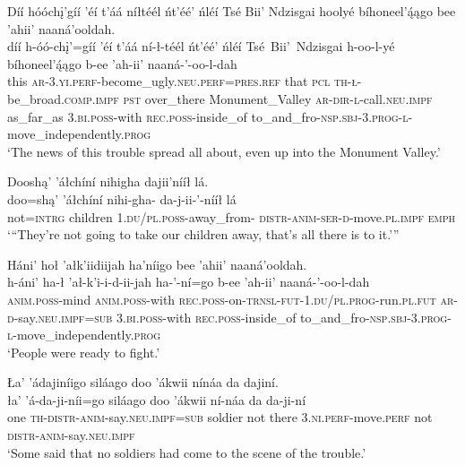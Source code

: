 \ea\label{ex:text3-5-1}
Díí hóóchį’gíí ’éí t’áá níłtéél ńt’éé’ ńléí Tsé Bii’ Ndzisgai hoolyé bíhoneel’ą́ągo bee ’ahii’ naaná’ooldah.\\
\gll díí	h-óó-chį’=gíí	’éí	t’áá ní-ł-téél ńt’éé’	ńléí	Tsé~Bii’~{Ndzisgai}	h-oo-l-yé	bíhoneel’ą́ągo	b-ee	’ah-ii’	naaná-’-oo-l-dah\\
     this	\textsc{ar}-3.\textsc{yi}.\textsc{perf}-become\_ugly.\textsc{neu}.\textsc{perf}=\textsc{pres}.\textsc{ref}	that	\textsc{pcl} \textsc{th}-\textsc{ł}-be\_broad.\textsc{comp}.\textsc{impf} \textsc{pst}	over\_there	Monument\_Valley	\textsc{ar}-\textsc{dir}-\textsc{l}-call.\textsc{neu}.\textsc{impf}	as\_far\_as	3.\textsc{bi}.\textsc{poss}-with	\textsc{rec}.\textsc{poss}-inside\_of	to\_and\_fro-\textsc{nsp}.\textsc{sbj}-3.\textsc{prog}-\textsc{l}-move\_independently.\textsc{prog}\\
\glt `The news of this trouble spread all about, even up into the Monument Valley.'
\z

\ea\label{ex:text3-5-2}
Dooshą’ ’áłchíní nihigha dajii’nííł lá.\\
\gll doo=shą’	’áłchíní	nihi-gha-	da-j-ii-’-nííł	lá\\
     not=\textsc{intrg}	children	1.\textsc{du}/\textsc{pl}.\textsc{poss}-away\_from-	\textsc{distr}-\textsc{anim}-\textsc{ser}-\textsc{d}-move.\textsc{pl}.\textsc{impf}	\textsc{emph}\\
\glt `{``}They're not going to take our children away, that's all there is to it.'''
\z

\ea\label{ex:text3-5-3}
Háni’ hoł ’ałk’iidiijah ha’níigo bee ’ahii’ naaná’ooldah.\\
\gll h-áni’	ha-ł	’ał-k’i-i-d-ii-jah	ha-’-ní=go	b-ee	’ah-ii’	naaná-’-oo-l-dah\\
     \textsc{anim}.\textsc{poss}-mind	\textsc{anim}.\textsc{poss}-with	\textsc{rec}.\textsc{poss}-on-\textsc{trnsl}-\textsc{fut}-1.\textsc{du}/\textsc{pl}.\textsc{prog}-run.\textsc{pl}.\textsc{fut}	\textsc{ar}-\textsc{d}-say.\textsc{neu}.\textsc{impf}=\textsc{sub}	3.\textsc{bi}.\textsc{poss}-with	\textsc{rec}.\textsc{poss}-inside\_of	to\_and\_fro-\textsc{nsp}.\textsc{sbj}-3.\textsc{prog}-\textsc{l}-move\_independently.\textsc{prog}\\
\glt `People were ready to fight.'
\z

\newpage
\ea\label{ex:text3-6-1}
Ła’ ’ádajiníigo siláago doo ’ákwii nínáa da dajiní.\\
\gll ła’	’á-da-ji-níi=go	siláago	doo	’ákwii	ní-náa	da	da-ji-ní\\
     one	\textsc{th}-\textsc{distr}-\textsc{anim}-say.\textsc{neu}.\textsc{impf}=\textsc{sub}	soldier	not	there	3.\textsc{ni}.\textsc{perf}-move.\textsc{perf}	not	\textsc{distr}-\textsc{anim}-say.\textsc{neu}.\textsc{impf}\\
\glt `Some said that no soldiers had come to the scene of the trouble.'
\z

